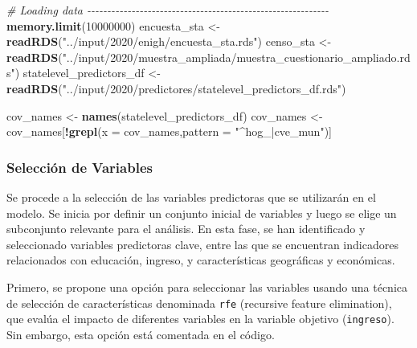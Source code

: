\documentclass[
  12pt,
]{book}
\newenvironment{Shaded}{\begin{snugshade}}{\end{snugshade}}
\newcommand{\AttributeTok}[1]{\textcolor[rgb]{0.13,0.29,0.53}{#1}}
\newcommand{\CommentTok}[1]{\textcolor[rgb]{0.56,0.35,0.01}{\textit{#1}}}
\newcommand{\DecValTok}[1]{\textcolor[rgb]{0.00,0.00,0.81}{#1}}
\newcommand{\FunctionTok}[1]{\textcolor[rgb]{0.13,0.29,0.53}{\textbf{#1}}}
\newcommand{\NormalTok}[1]{#1}
\newcommand{\OtherTok}[1]{\textcolor[rgb]{0.56,0.35,0.01}{#1}}
\newcommand{\SpecialCharTok}[1]{\textcolor[rgb]{0.81,0.36,0.00}{\textbf{#1}}}
\newcommand{\StringTok}[1]{\textcolor[rgb]{0.31,0.60,0.02}{#1}}
\begin{document}
\begin{Shaded}
\begin{Highlighting}[]
\CommentTok{\# Loading data {-}{-}{-}{-}{-}{-}{-}{-}{-}{-}{-}{-}{-}{-}{-}{-}{-}{-}{-}{-}{-}{-}{-}{-}{-}{-}{-}{-}{-}{-}{-}{-}{-}{-}{-}{-}{-}{-}{-}{-}{-}{-}{-}{-}{-}{-}{-}{-}{-}{-}{-}{-}{-}{-}{-}{-}{-}{-}{-}{-}}
\FunctionTok{memory.limit}\NormalTok{(}\DecValTok{10000000}\NormalTok{)}
\NormalTok{encuesta\_sta }\OtherTok{\textless{}{-}} \FunctionTok{readRDS}\NormalTok{(}\StringTok{"../input/2020/enigh/encuesta\_sta.rds"}\NormalTok{)}
\NormalTok{censo\_sta }\OtherTok{\textless{}{-}} \FunctionTok{readRDS}\NormalTok{(}\StringTok{"../input/2020/muestra\_ampliada/muestra\_cuestionario\_ampliado.rds"}\NormalTok{)}
\NormalTok{statelevel\_predictors\_df }\OtherTok{\textless{}{-}} \FunctionTok{readRDS}\NormalTok{(}\StringTok{"../input/2020/predictores/statelevel\_predictors\_df.rds"}\NormalTok{)}

\NormalTok{cov\_names }\OtherTok{\textless{}{-}} \FunctionTok{names}\NormalTok{(statelevel\_predictors\_df)}
\NormalTok{cov\_names }\OtherTok{\textless{}{-}}\NormalTok{ cov\_names[}\SpecialCharTok{!}\FunctionTok{grepl}\NormalTok{(}\AttributeTok{x =}\NormalTok{ cov\_names,}\AttributeTok{pattern =} \StringTok{"\^{}hog\_|cve\_mun"}\NormalTok{)]}
\end{Highlighting}
\end{Shaded}

\hypertarget{selecciuxf3n-de-variables}{%
\subsubsection*{Selección de Variables}\label{selecciuxf3n-de-variables}}

Se procede a la selección de las variables predictoras que se utilizarán en el modelo. Se inicia por definir un conjunto inicial de variables y luego se elige un subconjunto relevante para el análisis. En esta fase, se han identificado y seleccionado variables predictoras clave, entre las que se encuentran indicadores relacionados con educación, ingreso, y características geográficas y económicas.

Primero, se propone una opción para seleccionar las variables usando una técnica de selección de características denominada \texttt{rfe} (recursive feature elimination), que evalúa el impacto de diferentes variables en la variable objetivo (\texttt{ingreso}). Sin embargo, esta opción está comentada en el código.
\end{document}
